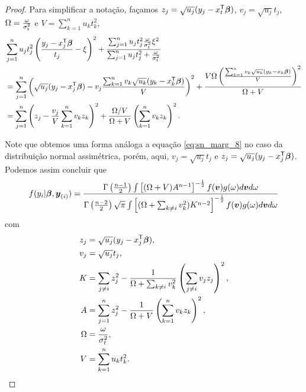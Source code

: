 \begin{proof}
Para simplificar a notação, façamos $z_j = \sqrt{u_j}(y_j - x_t^{\mathsf{T}}{\boldsymbol{\beta}})$, $v_j = \sqrt{u_j}t_j$, $\Omega = \frac{\omega}{\sigma^2_t}$ e $V = \sum_{k=1}^nu_kt_k^2$,
\begin{equation}
\begin{split}
& \sum_{j=1}^nu_jt_j^2\left(\frac{y_j-x_j^{\mathsf{T}}{\boldsymbol{\beta}}}{t_j} - \xi\right)^2 + \frac{\sum_{j=1}^nu_jt_j^2\frac{\omega}{\sigma^2_t}\xi^2}{\sum_{j=1}^nu_jt_j^2+\frac{\omega}{\sigma^2_t}} \\
& = \sum_{j=1}^n\left(\sqrt{u_j}(y_j-x_j^{\mathsf{T}}{\boldsymbol{\beta}}) - v_j\frac{\sum_{k=1}^nv_k\sqrt{u_k}(y_k-x_k^{\mathsf{T}}{\boldsymbol{\beta}})}{V}\right)^2 + \frac{V \Omega \left(\frac{\sum_{k=1}^nv_k\sqrt{u_k}(y_k-x_k{\boldsymbol{\beta}})}{V}\right)^2}{\Omega + V} \\
{} & =\sum_{j=1}^n\left(z_j - \frac{v_j}{V}\sum_{k=1}^nv_kz_k\right)^2 + \frac{\Omega/V}{\Omega + V}  \left(\sum_{k=1}^nv_kz_k\right)^2.
\end{split}
\end{equation}

Note que obtemos uma forma análoga a equação \eqref{eq:sn_marg_8} no caso da distribuição normal assimétrica, porém, aqui, $v_j=\sqrt{u_j}t_j$ e $z_j=\sqrt{u_j}(y_j-x_j^{\mathsf{T}}{\boldsymbol{\beta}})$. Podemos assim concluir que 
\begin{equation}\label{eq:st_marg_12}
\begin{split}
f(y_i|{\boldsymbol{\beta}},{\boldsymbol{y}_{(i)}}) = \frac{
\Gamma\left(\frac{n-1}{2}\right)\int \left[(\Omega+V) A^{n-1}\right]^{-\frac{1}{2}}f({\boldsymbol{v}})g(\omega)d{\boldsymbol{v}} d\omega
}{
\Gamma\left(\frac{n-2}{2}\right) \sqrt{\pi}\int \left[ (\Omega + \sum_{k \neq i}v_k^2) K^{n-2}\right]^{-\frac{1}{2}}f({\boldsymbol{v}})g(\omega)d{\boldsymbol{v}} d\omega 
}
\end{split}
\end{equation}
com 
\begin{align}
z_j & = \sqrt{u_j}(y_j-x_j^{\mathsf{T}}{\boldsymbol{\beta}}) \notag ,\\
v_j & = \sqrt{u_j}t_j \notag ,\\
K & = \sum_{j\neq i}z_j^2-\frac{1}{\Omega+\sum_{k \neq i}v_k^2}\left(\sum_{j\neq i}v_jz_j\right)^2 \notag ,\\
A & = \sum_{j=1}^nz_j^2 - \frac{1}{\Omega + V}\left(\sum_{k=1}^nv_kz_k\right)^2 ,\\
\Omega & = \frac{\omega}{\sigma^2_t} \notag ,\\
V & = \sum_{k=1}^nu_kt_k^2 \notag .
\end{align}


\end{proof}
